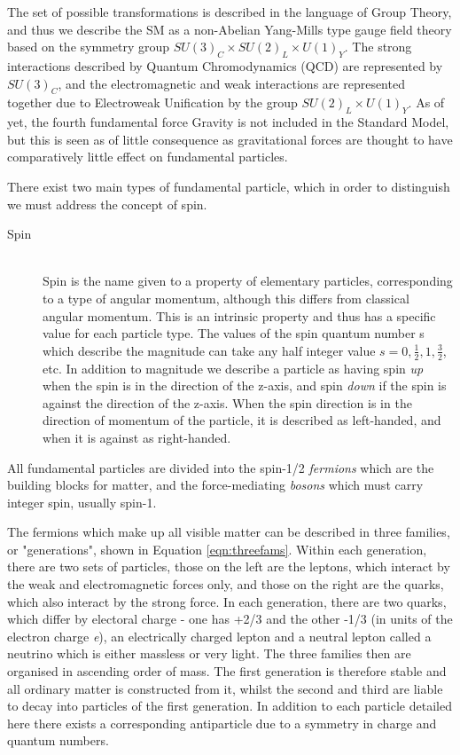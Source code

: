 The set of possible transformations is described in the language of Group Theory, and thus we describe the SM as a non-Abelian Yang-Mills type gauge field theory based on the symmetry group $SU(3)_{C} \times SU(2)_{L} \times U(1)_{Y}$. The strong interactions described by Quantum Chromodynamics (QCD) are represented by $SU(3)_{C}$, and the electromagnetic and weak interactions are represented together due to Electroweak Unification by the group $SU(2)_L \times U(1)_{Y}$. As of yet, the fourth fundamental force Gravity is not included in the Standard Model, but this is seen as of little consequence as gravitational forces are thought to have comparatively little effect on fundamental particles. 


There exist two main types of fundamental particle, which in order to distinguish we must address the concept of spin. 
\begin{description}
\item[Spin] \hfill \\
Spin is the name given to a property of elementary particles, corresponding to a type of angular momentum, although this differs from classical angular momentum. This is an intrinsic property and thus has a specific value for each particle type. The values of the spin quantum number s which describe the magnitude can take any half integer value $s=0, \frac{1}{2}, 1, \frac{3}{2}$, etc. In addition to magnitude we describe a particle as having spin \textit{up} when the spin is in the direction of the z-axis, and spin \textit{down} if the spin is against the direction of the z-axis. When the spin direction is in the direction of momentum of the particle, it is described as left-handed, and when it is against as right-handed. 
\end{description}
All fundamental particles are divided into the spin-1/2 \textit{fermions} which are the building blocks for matter, and the force-mediating \textit{bosons} which must carry integer spin, usually spin-1. 
 

The fermions which make up all visible matter can be described in three families, or "generations", shown in Equation \ref{eqn:threefams}. Within each generation, there are two sets of particles, those on the left are the leptons, which interact by the weak and electromagnetic forces only, and those on the right are the quarks, which also interact by the strong force. In each generation, there are two quarks, which differ by electoral charge - one has +2/3 and the other -1/3 (in units of the electron charge \textit{e}), an electrically charged lepton and a neutral lepton called a neutrino which is either massless or very light. The three families then are organised in ascending order of mass. The first generation is therefore stable and all ordinary matter is constructed from it, whilst the second and third are liable to decay into particles of the first generation. In addition to each particle detailed here there exists a corresponding antiparticle due to a symmetry in charge and quantum numbers.  

